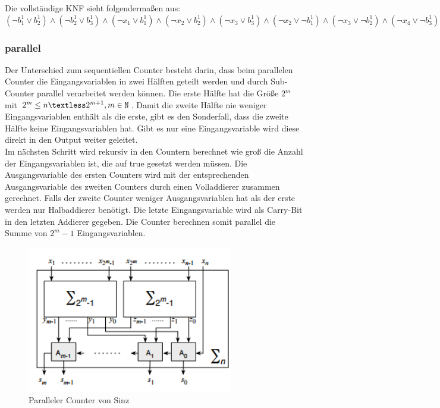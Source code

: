 \documentclass[a4,abstract=on]{scrartcl}
\begin{document}
Die vollständige KNF sieht folgendermaßen aus:\\
$(\neg b_1^1 \vee b_2^1) \wedge (\neg b_2^1 \vee b_3^1) \wedge (\neg x_1 \vee b_1^1) \wedge (\neg x_2 \vee b_2^1) \wedge (\neg x_3 \vee b_3^1) \wedge (\neg x_2 \vee \neg b_1^1) \wedge (\neg x_3 \vee \neg b_2^1) \wedge (\neg x_4 \vee \neg b_3^1) $\\

		\subsubsection{parallel}
Der Unterschied zum sequentiellen Counter besteht darin, dass beim parallelen Counter die Eingangsvariablen in zwei Hälften geteilt werden und durch Sub-Counter parallel verarbeitet werden können. Die erste Hälfte hat die Größe $2^m$ mit  $2^m \leq n \textless 2^{m+1}, m \in \mathtt{N}$. Damit die zweite Hälfte nie weniger Eingangsvariablen enthält als die erste, gibt es den Sonderfall, dass die zweite Hälfte keine Eingangsvariablen hat. Gibt es nur eine Eingangsvariable wird diese direkt in den Output weiter geleitet.\\
Im nächsten Schritt wird rekursiv in den Countern berechnet wie groß die Anzahl der Eingangsvariablen ist, die auf true gesetzt werden müssen. Die Ausgangsvariable des ersten Counters wird mit der entsprechenden Ausgangsvariable des zweiten Counters durch einen Volladdierer zusammen gerechnet. Falls der zweite Counter weniger Ausgangsvariablen hat als der erste werden nur Halbaddierer benötigt. Die letzte Eingangsvariable wird als Carry-Bit in den letzten Addierer gegeben. Die Counter berechnen somit parallel die Summe von $2^m-1$ Eingangsvariablen.\\

\begin{figure}[H]
\centering
\includegraphics[width=9cm]{Sinz_para.png}
\caption{Paralleler Counter von Sinz \cite[siehe][Seite 9] {sinz}}
\label{fig:sinz_counter_para}
\end{figure}
\end{document}
